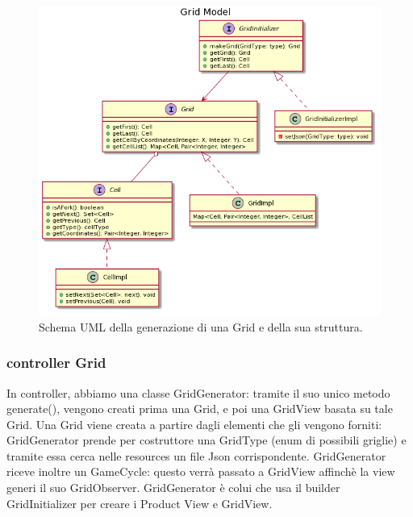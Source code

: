 \documentclass[a4paper,12pt]{report}
\begin{document}
	\begin{figure}[h]
		\centering{}
		\includegraphics[width=\textwidth]{images/ascenzo/grid_model.png}
		\caption{Schema UML della generazione di una Grid e della sua struttura.}
		\label{img:gridmodel}
	\end{figure}

    \subsubsection {controller Grid}
	In controller, abbiamo una classe GridGenerator: tramite il suo unico metodo generate(), vengono creati prima una Grid, e poi una GridView basata su tale Grid.
	Una Grid viene creata a partire dagli elementi che gli vengono forniti: GridGenerator prende per costruttore una GridType (enum di possibili griglie) e tramite essa cerca nelle resources un file Json corrispondente.
	GridGenerator riceve inoltre un GameCycle: questo verrà passato a GridView affinchè la view generi il suo GridObserver.
    GridGenerator è colui che usa il builder GridInitializer per creare i Product View e GridView.
\end{document}
